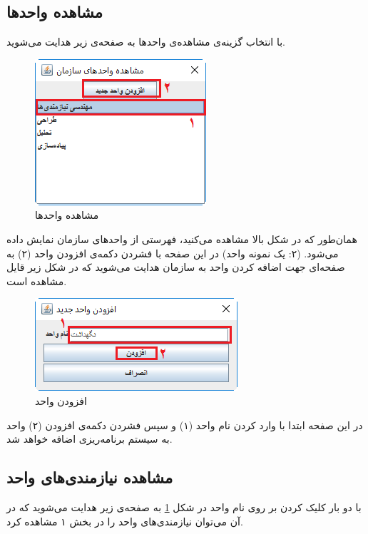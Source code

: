\subsection{مشاهده واحدها}
با انتخاب گزینه‌ی مشاهده‌ی واحدها به صفحه‌ی زیر هدایت می‌شوید.
	\begin{figure}[H]
		\centering
		\includegraphics[scale=0.9]{img/manual/viewUnits}
		\caption{مشاهده واحدها}
		\label{f100}
	\end{figure}
همان‌طور که در شکل بالا مشاهده می‌کنید، فهرستی از واحدهای سازمان نمایش داده می‌شود. (۲: یک نمونه واحد) در این صفحه با فشردن دکمه‌ی افزودن واحد (۲) به صفحه‌ای جهت اضافه کردن واحد به سازمان هدایت می‌شوید که در شکل زیر قایل مشاهده است.
	\begin{figure}[H]
		\centering
		\includegraphics[scale=0.8]{img/manual/addUnit}
		\caption{افزودن واحد}
	\end{figure}
در این صفحه ابتدا با وارد کردن نام واحد (۱) و سپس فشردن دکمه‌ی افزودن (۲) واحد به سیستم برنامه‌ریزی اضافه خواهد شد.

\subsection{مشاهده نیازمندی‌های واحد}
با دو بار کلیک کردن بر روی نام واحد در شکل 
\ref{f100}
به صفحه‌ی زیر هدایت می‌شوید که در آن می‌توان نیازمندی‌های واحد را در بخش ۱ مشاهده کرد.

